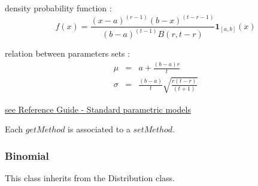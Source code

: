 \begin{description}
\begin{description}
  \end{description}


\item[Details :]  \rule{0pt}{1em}
  \begin{description}
  \item density probability function :
    $$
    f(x) = \frac{(x-a)^{(r-1)}(b-x)^{(t-r-1)}}{(b-a)^{(t-1)}B(r,t-r)}\boldsymbol{1}_{[a,b]}(x)
    $$
  \item relation between parameters sets :
    $$
    \begin{array}{lcl}
      \mu & = & \displaystyle a + \frac{(b - a)  r}{ t} \\
      \sigma & = & \displaystyle  \frac{(b - a)}{ t}\sqrt{\frac{r (t - r)}{ (t + 1)}}
    \end{array}
    $$
  \end{description}

\item[Links :]  \rule{0pt}{1em}
  \href{OpenTURNS_ReferenceGuide.pdf}{see Reference Guide - Standard parametric models}
\end{description}

Each  $getMethod$  is associated to a $setMethod$.


\newpage \subsubsection{Binomial}

This class inherits from the Distribution class.

